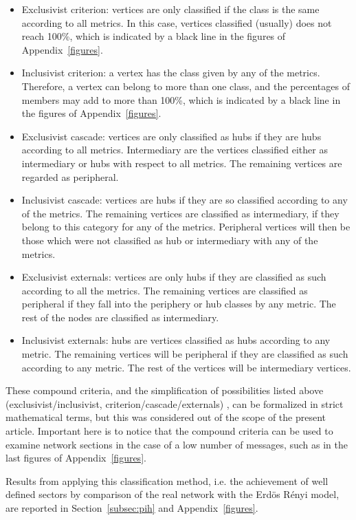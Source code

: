 \documentclass[%
 aip,
 jmp,%
 amsmath,amssymb,
 reprint,%
]{revtex4-1}
\begin{document}
\begin{itemize}
\item Exclusivist criterion:  vertices are only classified if the class is the same according to all metrics. In this case, vertices classified (usually) does not reach 100\%, which is indicated by a black line in the figures of Appendix~\ref{figures}.
        \item Inclusivist criterion: a vertex has the class given by any of the metrics. Therefore, a vertex can belong to more than one class, and the percentages of members may add to more than 100\%, which is indicated by a black line in the figures of Appendix~\ref{figures}.
    \item Exclusivist cascade: vertices are only classified as hubs if they are hubs according to all metrics. Intermediary are the vertices classified either as intermediary or hubs with respect to all metrics. The remaining vertices are regarded as peripheral.
    \item Inclusivist cascade: vertices are hubs if they are so classified according to any of the metrics. The remaining vertices are classified as intermediary, if they belong to this category for any of the metrics. Peripheral vertices will then be those which were not classified as hub or intermediary with any of the metrics. 
    \item Exclusivist externals: vertices are only hubs if they are classified as such according to all the metrics. The remaining vertices are classified as peripheral if they fall into the periphery or hub classes by any metric. The rest of the nodes are classified as intermediary.
    \item Inclusivist externals: hubs are vertices classified as hubs according to any metric. The remaining vertices will be peripheral if they are classified as such according to any metric. The rest of the vertices will be intermediary vertices.
\end{itemize}



These compound criteria, and the simplification of possibilities listed above (exclusivist/inclusivist, criterion/cascade/externals) , can be formalized in strict mathematical terms, but this was considered out of the scope of the present article. Important here is to notice that the compound criteria can be used to examine network sections in the case of a low number of messages, such as in the last figures of Appendix~\ref{figures}.

Results from applying this classification method, i.e. the achievement of well defined sectors by comparison of the real network with the Erd\"os R\'enyi model, are reported in Section~\ref{subsec:pih} and Appendix~\ref{figures}.
\end{document}
